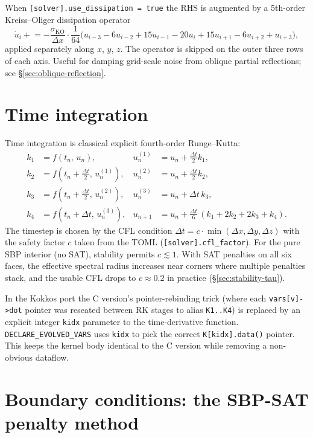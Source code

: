 \documentclass[11pt]{article}
\begin{document}
When \texttt{[solver].use\_dissipation = true} the RHS is augmented
by a 5th-order Kreiss--Oliger dissipation operator
\[
  \dot u_i \mathrel{+}=
    -\frac{\sigma_{\text{KO}}}{\Delta x}
    \cdot \frac{1}{64}\bigl(
       u_{i-3} - 6 u_{i-2} + 15 u_{i-1}
       - 20 u_i
       + 15 u_{i+1} - 6 u_{i+2} + u_{i+3}\bigr),
\]
applied separately along $x$, $y$, $z$.  The operator is skipped
on the outer three rows of each axis.  Useful for damping
grid-scale noise from oblique partial reflections; see
\S\ref{sec:oblique-reflection}.

\section{Time integration}
\label{sec:time}

Time integration is classical explicit fourth-order Runge--Kutta:
\begin{align*}
  k_1 &= f(t_n,\, u_n),                  & u_n^{(1)} &= u_n + \tfrac{\Delta t}{2} k_1,\\
  k_2 &= f(t_n + \tfrac{\Delta t}{2},\, u_n^{(1)}), &
                     u_n^{(2)} &= u_n + \tfrac{\Delta t}{2} k_2,\\
  k_3 &= f(t_n + \tfrac{\Delta t}{2},\, u_n^{(2)}), &
                     u_n^{(3)} &= u_n + \Delta t\, k_3,\\
  k_4 &= f(t_n + \Delta t,\, u_n^{(3)}), &
                     u_{n+1} &= u_n + \tfrac{\Delta t}{6}\,
                        (k_1 + 2 k_2 + 2 k_3 + k_4).
\end{align*}
The timestep is chosen by the CFL condition
\(\Delta t = c \cdot \min(\Delta x, \Delta y, \Delta z)\)
with the safety factor $c$ taken from the TOML
(\texttt{[solver].cfl\_factor}).  For the pure SBP interior (no
SAT), stability permits $c \lesssim 1$.  With SAT penalties on all
six faces, the effective spectral radius increases near corners
where multiple penalties stack, and the usable CFL drops to
$c \approx 0.2$ in practice (\S\ref{sec:stability-tau}).

In the Kokkos port the C version's pointer-rebinding trick (where
each \texttt{vars[v]->dot} pointer was reseated between RK stages
to alias \texttt{K1..K4}) is replaced by an explicit integer
\texttt{kidx} parameter to the time-derivative function.
\texttt{DECLARE\_EVOLVED\_VARS} uses \texttt{kidx} to pick the
correct \texttt{K[kidx].data()} pointer.  This keeps the kernel
body identical to the C version while removing a non-obvious
dataflow.

\section{Boundary conditions: the SBP-SAT penalty method}
\label{sec:sat}
\end{document}
